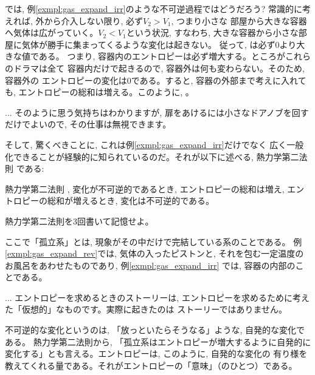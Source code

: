 では, 例\ref{exmpl:gas_expand_irr}のような不可逆過程ではどうだろう? 
常識的に考えれば, 外から介入しない限り, 必ず$V_2>V_1$, つまり小さな
部屋から大きな容器へ気体は広がっていく。$V_2<V_1$という状況, すなわち, 
大きな容器から小さな部屋に気体が勝手に集まってくるような変化は起きない。
従って, は必ず0より大きな値である。
つまり, 容器内のエントロピーは必ず増大する。ところがこれらのドラマは全て
容器内だけで起きるので, 容器外は何も変わらない。そのため, 容器外の
エントロピーの変化は0である。すると, 容器の外部まで考えに入れても, 
エントロピーの総和は増える。このように, 。

\begin{faq}{\small{}
 ... そのように思う気持ちはわかりますが, 扉をあけるには小さなドアノブを回す
だけでよいので, その仕事は無視できます。}\end{faq}\mv

そして, 驚くべきことに, これは例\ref{exmpl:gas_expand_irr}だけでなく
広く一般化できることが経験的に知られているのだ。それが以下に述べる, 熱力学第二法則
である:

\begin{itembox}{熱力学第二法則}
, 変化が不可逆的であるとき, エントロピーの総和は増え, 
エントロピーの総和が増えるとき, 変化は不可逆的である。
\end{itembox}

\begin{q}\label{q:themlaw2} 熱力学第二法則を3回書いて記憶せよ。\end{q}\mv

ここで「孤立系」とは, 現象がその中だけで完結している系のことである。
例\ref{exmpl:gas_expand_rev}では, 気体の入ったピストンと, 
それを包む一定温度のお風呂をあわせたものであり, 例\ref{exmpl:gas_expand_irr}
では, 容器の内部のことである。

\begin{faq}{\small{} ... エントロピーを求めるときのストーリーは, 
エントロピーを求めるために考えた「仮想的」なものです。実際に起きたのは
ストーリーではありません。}\end{faq}\mv

不可逆的な変化というのは, 「放っといたらそうなる」ような, 自発的な変化である。
熱力学第二法則から, 「孤立系はエントロピーが増大するように自発的に
変化する」とも言える。エントロピーは, このように, 自発的な変化の
有り様を教えてくれる量である。それがエントロピーの「意味」（のひとつ）である。

